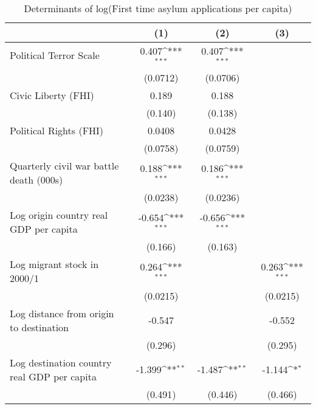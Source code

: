 \begin{table}[htbp]\centering
\def\sym#1{\ifmmode^{#1}\else\(^{#1}\)\fi}
\caption{Determinants of log(First time asylum applications per capita)}
\begin{tabular}{l*{3}{c}}
\hline\hline
                    &\multicolumn{1}{c}{(1)}         &\multicolumn{1}{c}{(2)}         &\multicolumn{1}{c}{(3)}         \\
\hline
Political Terror Scale&       0.407\sym{***}&       0.407\sym{***}&                     \\
                    &    (0.0712)         &    (0.0706)         &                     \\
[1em]
Civic Liberty (FHI) &       0.189         &       0.188         &                     \\
                    &     (0.140)         &     (0.138)         &                     \\
[1em]
Political Rights (FHI)&      0.0408         &      0.0428         &                     \\
                    &    (0.0758)         &    (0.0759)         &                     \\
[1em]
Quarterly civil war battle death (000s)&       0.188\sym{***}&       0.186\sym{***}&                     \\
                    &    (0.0238)         &    (0.0236)         &                     \\
[1em]
Log origin country real GDP per capita&      -0.654\sym{***}&      -0.656\sym{***}&                     \\
                    &     (0.166)         &     (0.163)         &                     \\
[1em]
Log migrant stock in 2000/1&       0.264\sym{***}&                     &       0.263\sym{***}\\
                    &    (0.0215)         &                     &    (0.0215)         \\
[1em]
Log distance from origin to destination&      -0.547         &                     &      -0.552         \\
                    &     (0.296)         &                     &     (0.295)         \\
[1em]
Log destination country real GDP per capita&      -1.399\sym{**} &      -1.487\sym{**} &      -1.144\sym{*}  \\
                    &     (0.491)         &     (0.446)         &     (0.466)         \\

\end{tabular}
\end{table}

